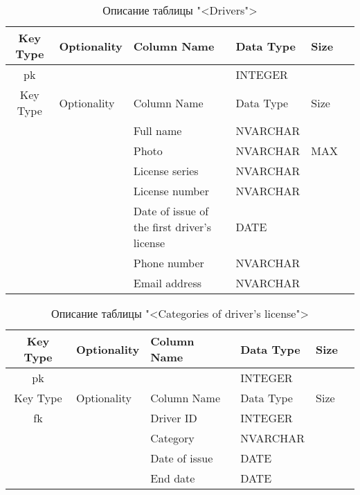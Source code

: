 \begin{xltabular}{\textwidth}{|c|X|X|X|X|X|}
	\caption{Описание таблицы "<Drivers">\label{prod:table2}}\\ \hline
	\centrow Key Type & \centrow Optionality & \centrow Column Name & \centrow Data Type & \centrow Size \\ \hline
	\centrow pk & \centrow * &  & \centrow INTEGER & \\ \hline
	\endfirsthead
	\centrow Key Type & \centrow Optionality & \centrow Column Name & \centrow Data Type & \centrow Size \\ \hline
	\finishhead
	& \centrow * & \centrow Full name & \centrow NVARCHAR &  \\ \hline 
	& \centrow * & \centrow Photo & \centrow NVARCHAR & \centrow MAX \\ \hline
	& \centrow * & \centrow License series & \centrow NVARCHAR &  \\ \hline 
	& \centrow * & \centrow License number & \centrow NVARCHAR &   \\ \hline 
	& \centrow * & \centrow Date of issue of the first driver's license & \centrow DATE & \centrow  \\ \hline 
	& \centrow * & \centrow Phone number & \centrow NVARCHAR &  \\ \hline
	& \centrow * & \centrow Email address & \centrow NVARCHAR &  \\ \hline
\end{xltabular}

\begin{xltabular}{\textwidth}{|c|X|X|X|X|X|}
	\caption{Описание таблицы "<Categories of driver's license">\label{prod:table3}}\\ \hline
	\centrow Key Type & \centrow Optionality & \centrow Column Name & \centrow Data Type & \centrow Size \\ \hline
	\centrow pk & \centrow * &  & \centrow INTEGER & \\ \hline
	\endfirsthead
	\centrow Key Type & \centrow Optionality & \centrow Column Name & \centrow Data Type & \centrow Size \\ \hline
	\finishhead
	fk & \centrow * & \centrow Driver ID & \centrow INTEGER & \centrow  \\ \hline 
	& \centrow * & \centrow Category & \centrow NVARCHAR &  \\ \hline
	& \centrow * & \centrow Date of issue & \centrow DATE & \centrow \\ \hline 
	& \centrow * & \centrow End date & \centrow DATE & \centrow  \\ \hline 
\end{xltabular}


